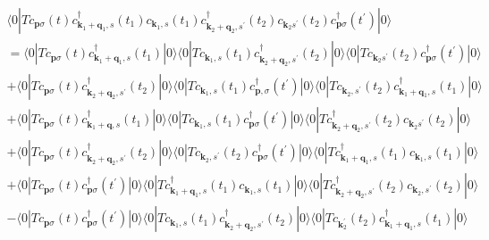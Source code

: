 \documentclass[a4paper,14pt]{article}
\begin{document}
\begin{equation*}
    \begin{array}{l}
        \langle0 |T c_{\mathbf{p} \sigma}(t) c_{\mathbf{k}_{1}+\mathbf{q}_{1}, s}^{\dagger} (t_{1} ) c_{\mathbf{k}_{1}, s} (t_{1} ) c_{\mathbf{k}_{2}+\mathbf{q}_{2}, s^{\prime}}^{\dagger} (t_{2} ) c_{\mathbf{k}_{2} s^{\prime}} (t_{2} ) c_{\mathbf{p} \sigma}^{\dagger} (t^{\prime} ) |0\rangle \\
        =\langle0 |T c_{\mathbf{p} \sigma}(t) c_{\mathbf{k}_{1}+\mathbf{q}_{1}, s}^{\dagger} (t_{1} ) |0\rangle \langle0 |T c_{\mathbf{k}_{1}, s} (t_{1} ) c_{\mathbf{k}_{2}+\mathbf{q}_{2}, s^{\prime}}^{\dagger} (t_{2} ) |0\rangle\langle0 |T c_{\mathbf{k}_{2} s^{\prime}} (t_{2} ) c_{\mathbf{p} \sigma}^{\dagger} (t^{\prime} ) |0\rangle \\
        +\langle0 |T c_{\mathbf{p} \sigma}(t) c_{\mathbf{k}_{2}+\mathbf{q}_{2}, s^{\prime}}^{\dagger} (t_{2} ) |0\rangle \langle0 |T c_{\mathbf{k}_{1}, s} (t_{1} ) c_{\mathbf{p}, \sigma}^{\dagger} (t^{\prime} ) |0\rangle\langle0 |T c_{\mathbf{k}_{2}, s^{\prime}} (t_{2} ) c_{\mathbf{k}_{1}+\mathbf{q}_{1}, s}^{\dagger} (t_{1} ) |0\rangle \\
        +\langle0 |T c_{\mathbf{p} \sigma}(t) c_{\mathbf{k}_{1}+\mathbf{q}, s}^{\dagger} (t_{1} ) |0\rangle \langle0 |T c_{\mathbf{k}_{1}, s} (t_{1} ) c_{\mathbf{p} \sigma}^{\dagger} (t^{\prime} ) |0\rangle \langle0 |T c_{\mathbf{k}_{2}+\mathbf{q}_{2}, s^{\prime}}^{\dagger} (t_{2} ) c_{\mathbf{k}_{2} s^{\prime}} (t_{2} ) |0\rangle \\
        +\langle0 |T c_{\mathbf{p} \sigma}(t) c_{\mathbf{k}_{2}+\mathbf{q}_{2}, s^{\prime}}^{\dagger} (t_{2} ) |0\rangle \langle0 |T c_{\mathbf{k}_{2}, s^{\prime}} (t_{2} ) c_{\mathbf{p} \sigma}^{\dagger} (t^{\prime} ) |0\rangle\langle0 |T c_{\mathbf{k}_{1}+\mathbf{q}_{1}, s}^{\dagger} (t_{1} ) c_{\mathbf{k}_{1}, s} (t_{1} ) |0\rangle \\
        +\langle0 |T c_{\mathbf{p} \sigma}(t) c_{\mathbf{p} \sigma}^{\dagger} (t^{\prime} ) |0\rangle \langle0 |T c_{\mathbf{k}_{1}+\mathbf{q}_{1}, s}^{\dagger} (t_{1} ) c_{\mathbf{k}_{1}, s} (t_{1} ) |0\rangle\langle0 |T c_{\mathbf{k}_{2}+\mathbf{q}_{2}, s^{\prime}}^{\dagger} (t_{2} ) c_{\mathbf{k}_{2}, s^{\prime}} (t_{2} ) |0\rangle \\
        -\langle0 |T c_{\mathbf{p} \sigma}(t) c_{\mathbf{p} \sigma}^{\dagger} (t^{\prime} ) |0\rangle \langle0 |T c_{\mathbf{k}_{1}, s} (t_{1} ) c_{\mathbf{k}_{2}+\mathbf{q}_{2}, s^{\prime}}^{\dagger} (t_{2} ) |0\rangle\langle0 |T c_{\mathbf{k}_{2}^{\prime}} (t_{2} ) c_{\mathbf{k}_{1}+\mathbf{q}_{1}, s}^{\dagger} (t_{1} ) |0\rangle
        \end{array}
\end{equation*}
\end{document}
